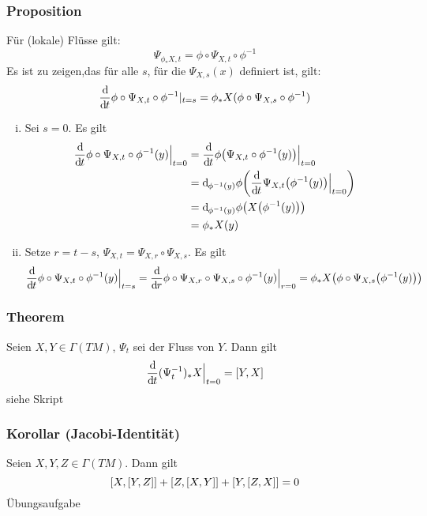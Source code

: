 \subsubsection{Proposition}
\label{ssub:166}
Für (lokale) Flüsse gilt:
\[
\Psi_{\phi_* X,t} = \phi \circ \Psi_{X,t} \circ \phi^{-1}
\]
Es ist zu zeigen,das für alle $s$, für die $\Psi_{X,s}(x)$ definiert ist, gilt:
\[
\frac{\mathrm{d}\mkern-1.0mu}{\mathrm{d}\mkern-1.0mu t} \phi \circ \Psi_{X,t} \circ \phi^{-1}\vert_{t=s} = \phi_* X(\phi \circ \Psi_{X,s} \circ \phi^{-1})
\]
\begin{enumerate}[(i)]
\item Sei $s = 0$. Es gilt
\begin{align*}
\frac{\mathd}{\mathd t} \phi \circ \Psi_{X,t} \circ \phi^{-1}(y) \Big\vert_{t=0}& = \frac{\mathd}{\mathd t} \phi \enbrace*{\Psi_{X,t} \circ \phi^{-1}(y)} \Big\vert_{t=0}\\
&= \mathd_{\phi^{-1}(y)} \phi\enbrace[\bigg]{\frac{\mathd}{\mathd t} \Psi_{X,t}\enbrace*{\phi^{-1}(y)}\Big\vert_{t=0}}\\
&= \mathd_{\phi^{-1}(y)} \phi \enbrace*{X \enbrace*{\phi^{-1}(y)}}\\
&= \phi_* X(y)
\end{align*}
\item Setze $r = t - s$, $\Psi_{X,t} = \Psi_{X,r} \circ \Psi_{X,s}$. Es gilt
\[
\frac{\mathd}{\mathd t} \phi \circ \Psi_{X,t} \circ \phi^{-1}(y) \Big\vert_{t=s} = \frac{\mathd}{\mathd r} \phi \circ \Psi_{X,r} \circ \Psi_{X,s} \circ \phi^{-1}(y) \Big\vert_{r=0} = \phi_* X\enbrace*{\phi \circ \Psi_{X,s}\enbrace*{\phi^{-1}(y)}}
\]
\end{enumerate}

\subsubsection{Theorem}
\label{ssub:167}
Seien $X,Y \in \Gamma(TM)$, $\Psi_t$ sei der Fluss von $Y$. Dann gilt
\[
\frac{\mathrm{d}\mkern-1.0mu}{\mathrm{d}\mkern-1.0mu t} (\Psi_t^{-1})_* X \Big\vert_{t=0} = [Y,X]
\]
siehe Skript

\subsubsection[Korollar: Jacobi-Identität]{Korollar (Jacobi-Identität)}
\label{ssub:168}
Seien $X,Y,Z\in \Gamma(TM)$. Dann gilt
\[
[X,[Y,Z]] + [Z,[X,Y]] + [Y,[Z,X]] = 0
\]
Übungsaufgabe

